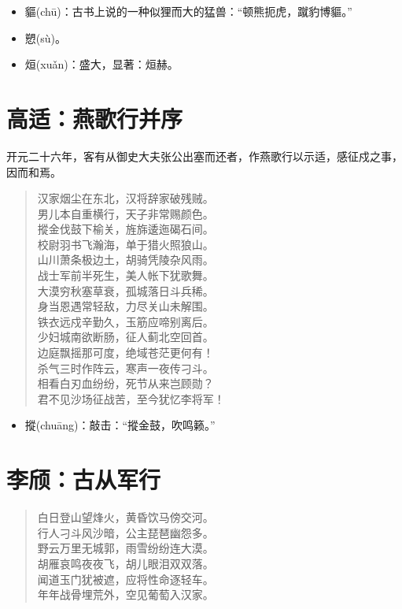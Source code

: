 \documentclass[12pt,oneside]{book}
\newenvironment{shici}{%
\begin{verse}\centering\yanti\large\hspace{12pt}}{\end{verse}}
\begin{document}
\begin{common-format}
\begin{itemize}
\item 貙(chū)：古书上说的一种似狸而大的猛兽：“顿熊扼虎，蹴豹博貙。”
\item 愬(sù)。
\item 烜(xuǎn)：盛大，显著：烜赫。
\end{itemize}

\chapter{高适：燕歌行并序}
开元二十六年，客有从御史大夫张公出塞而还者，作燕歌行以示适，感征戍之事，因而和焉。

\begin{shici}
汉家烟尘在东北，汉将辞家破残贼。\\
男儿本自重横行，天子非常赐颜色。\\
摐金伐鼓下榆关，旌旆逶迤碣石间。\\
校尉羽书飞瀚海，单于猎火照狼山。\\
山川萧条极边土，胡骑凭陵杂风雨。\\
战士军前半死生，美人帐下犹歌舞。\\
大漠穷秋塞草衰，孤城落日斗兵稀。\\
身当恩遇常轻敌，力尽关山未解围。\\
铁衣远戍辛勤久，玉筋应啼别离后。\\
少妇城南欲断肠，征人蓟北空回首。\\
边庭飘摇那可度，绝域苍茫更何有！\\
杀气三时作阵云，寒声一夜传刁斗。\\
相看白刃血纷纷，死节从来岂顾勋？\\
君不见沙场征战苦，至今犹忆李将军！
\end{shici}

\begin{itemize}
\item 摐(chuāng)：敲击：“摐金鼓，吹鸣籁。”
\end{itemize}


\chapter{李颀：古从军行}
\begin{shici}
白日登山望烽火，黄昏饮马傍交河。\\
行人刁斗风沙暗，公主琵琶幽怨多。\\
野云万里无城郭，雨雪纷纷连大漠。\\
胡雁哀鸣夜夜飞，胡儿眼泪双双落。\\
闻道玉门犹被遮，应将性命逐轻车。\\
年年战骨埋荒外，空见葡萄入汉家。
\end{shici}


\end{common-format}
\end{document}
